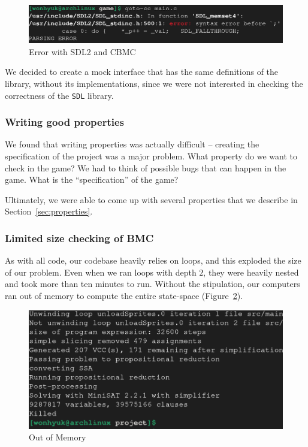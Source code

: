 \documentclass{article}
\begin{document}
\begin{figure}[h!]
    \includegraphics[width=\linewidth]{cbmc-sdl.png}
    \caption{Error with SDL2 and CBMC}
    \label{fig:cbmc-sdl}
\end{figure}

We decided to create a mock interface that has the same definitions of the library, without its implementations,
since we were not interested in checking the correctness of the \texttt{SDL} library.

\subsubsection{Writing good properties}
We found that writing properties was actually difficult -- creating the specification of the project was a major problem.
What property do we want to check in the game?
We had to think of possible bugs that can happen in the game.
What is the ``specification'' of the game?

Ultimately, we were able to come up with several properties that we describe in Section~\ref{sec:properties}.

\subsubsection{Limited size checking of BMC}
As with all code, our codebase heavily relies on loops, and this exploded the size of our problem.
Even when we ran loops with depth $2$, they were heavily nested and took more than ten minutes to run.
Without the stipulation, our computers ran out of memory to compute the entire state-space (Figure~\ref{fig:killed}).
\begin{figure}[h!]
    \includegraphics[width=\linewidth]{killed.png}
    \caption{Out of Memory}
    \label{fig:killed}
\end{figure}
\end{document}
